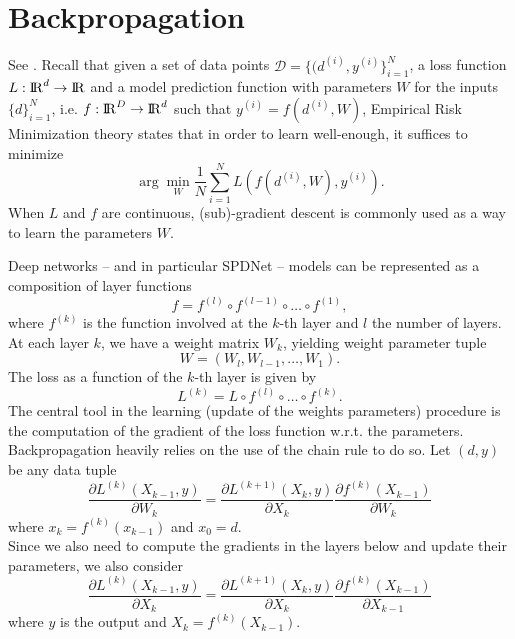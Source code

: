 \documentclass[10pt,a4paper]{book}
\theoremstyle{definition}
\theoremstyle{plain}
\theoremstyle{remark}
\def\R{{\rm I\kern-0.16em R}}
\begin{document}
\section{Backpropagation}
See \cite{ionescu2015matrix}. 
Recall that given a set of data points $\mathcal{D}=\{(d^{(i)},y^{(i)}\}_{i=1}^{N}$, a loss function $L:\R^d\to \R$ and a model prediction function with parameters $W$ for the inputs $\{d\}_{i=1}^{N}$, i.e. $f:\R^{D}\to \R^d$ such that $y^{(i)}=f(d^{(i)},W)$, Empirical Risk Minimization theory states that in order to learn well-enough, it suffices to minimize
$$\arg \min_{W}\frac{1}{N}\sum_{i=1}^{N}L(f(d^{(i)},W),y^{(i)}).$$
When $L$ and $f$ are continuous, (sub)-gradient descent is commonly used as a way to learn the parameters $W$. 

Deep networks -- and in particular SPDNet -- models can be represented as a composition of layer functions
$$f=f^{(l)}\circ f^{(l-1)}\circ \dots \circ f^{(1)},$$
where $f^{(k)}$ is the function involved at the $k$-th layer and $l$ the number of layers.
At each layer $k$, we have a weight matrix $W_k$, yielding weight parameter tuple 
$$W=(W_l, W_{l-1},\dots,W_1).$$
The loss as a function of the $k$-th layer is given by
$$L^{(k)}=L\circ f^{(l)}\circ \dots \circ f^{(k)}.$$
The central tool in the learning (update of the weights parameters) procedure is the computation of the gradient of the loss function w.r.t. the parameters. Backpropagation heavily relies on the use of the chain rule to do so. Let $(d,y)$ be any data tuple
\begin{equation}\label{eq.gradW} 
\frac{\partial L^{(k)}(X_{k-1},y)}{\partial W_k}=\frac{\partial L^{(k+1)}(X_{k},y)}{\partial X_k}\frac{\partial f^{(k)}(X_{k-1})}{\partial W_k}
\end{equation}
where $x_k=f^{(k)}(x_{k-1})$ and $x_0=d$. \\ 
Since we also need to compute the gradients in the layers below and update their parameters, we also consider 
$$
\frac{\partial L^{(k)}(X_{k-1},y)}{\partial X_k}=\frac{\partial L^{(k+1)}(X_{k},y)}{\partial X_k}\frac{\partial f^{(k)}(X_{k-1})}{\partial X_{k-1}}
$$
where $y$ is the output and $X_k=f^{(k)}(X_{k-1})$.
\end{document}
